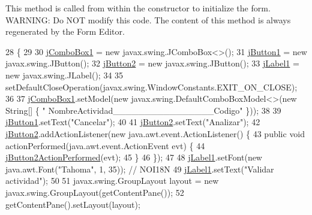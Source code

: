 This method is called from within the constructor to initialize the form. W\+A\+R\+N\+I\+NG\+: Do N\+OT modify this code. The content of this method is always regenerated by the Form Editor. 
\begin{DoxyCode}
28                                   \{
29 
30         \mbox{\hyperlink{classsoftware_1_1elegirvalid_a478fdcb1e161a2c0db069e191d614075}{jComboBox1}} = \textcolor{keyword}{new} javax.swing.JComboBox<>();
31         \mbox{\hyperlink{classsoftware_1_1elegirvalid_a2e45ed3b1ed8951950588a561e23a890}{jButton1}} = \textcolor{keyword}{new} javax.swing.JButton();
32         \mbox{\hyperlink{classsoftware_1_1elegirvalid_a9923ae8164e7886f8cf993f534e932ad}{jButton2}} = \textcolor{keyword}{new} javax.swing.JButton();
33         \mbox{\hyperlink{classsoftware_1_1elegirvalid_a77ded24e7c4de4317d1e1ea4dea875e6}{jLabel1}} = \textcolor{keyword}{new} javax.swing.JLabel();
34 
35         setDefaultCloseOperation(javax.swing.WindowConstants.EXIT\_ON\_CLOSE);
36 
37         \mbox{\hyperlink{classsoftware_1_1elegirvalid_a478fdcb1e161a2c0db069e191d614075}{jComboBox1}}.setModel(\textcolor{keyword}{new} javax.swing.DefaultComboBoxModel<>(\textcolor{keyword}{new} String[] \{ \textcolor{stringliteral}{"
      NombreActividad\_\_\_\_\_\_\_\_\_\_\_\_\_\_\_\_Codigo"} \}));
38 
39         \mbox{\hyperlink{classsoftware_1_1elegirvalid_a2e45ed3b1ed8951950588a561e23a890}{jButton1}}.setText(\textcolor{stringliteral}{"Cancelar"});
40 
41         \mbox{\hyperlink{classsoftware_1_1elegirvalid_a9923ae8164e7886f8cf993f534e932ad}{jButton2}}.setText(\textcolor{stringliteral}{"Analizar"});
42         \mbox{\hyperlink{classsoftware_1_1elegirvalid_a9923ae8164e7886f8cf993f534e932ad}{jButton2}}.addActionListener(\textcolor{keyword}{new} java.awt.event.ActionListener() \{
43             \textcolor{keyword}{public} \textcolor{keywordtype}{void} actionPerformed(java.awt.event.ActionEvent evt) \{
44                 \mbox{\hyperlink{classsoftware_1_1elegirvalid_a65e2a0fb21c23474d57dba8d86811782}{jButton2ActionPerformed}}(evt);
45             \}
46         \});
47 
48         \mbox{\hyperlink{classsoftware_1_1elegirvalid_a77ded24e7c4de4317d1e1ea4dea875e6}{jLabel1}}.setFont(\textcolor{keyword}{new} java.awt.Font(\textcolor{stringliteral}{"Tahoma"}, 1, 35)); \textcolor{comment}{// NOI18N}
49         \mbox{\hyperlink{classsoftware_1_1elegirvalid_a77ded24e7c4de4317d1e1ea4dea875e6}{jLabel1}}.setText(\textcolor{stringliteral}{"Validar actividad"});
50 
51         javax.swing.GroupLayout layout = \textcolor{keyword}{new} javax.swing.GroupLayout(getContentPane());
52         getContentPane().setLayout(layout);

\end{DoxyCode}
